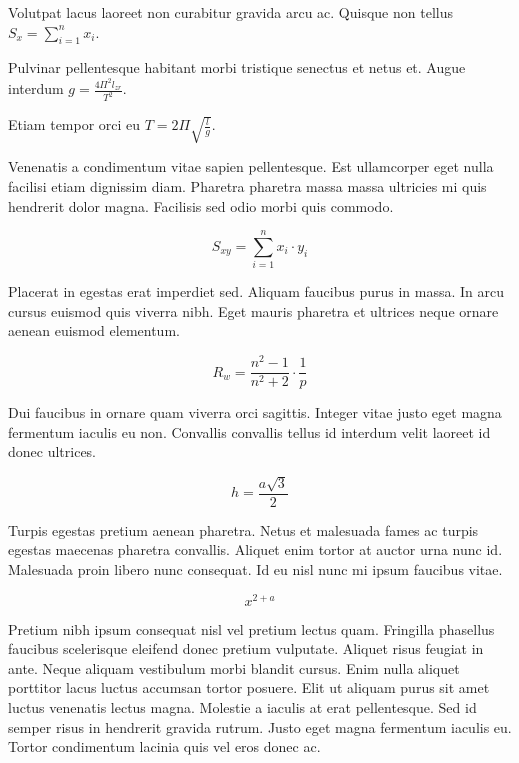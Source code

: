 \documentclass{article}
\begin{document}
Volutpat lacus laoreet non curabitur gravida arcu ac. Quisque non tellus \begin{math}
	S_x=\sum_{i=1}^{n}x_i
\end{math}.\newline

Pulvinar pellentesque habitant morbi tristique senectus et netus et. Augue interdum $ g=\frac{4\Pi^2l_{zr}}{T^2} $.\newline

Etiam tempor orci eu \( T=2\Pi \sqrt{\frac{l}{g}} \).\newline

Venenatis a condimentum vitae sapien pellentesque. Est ullamcorper eget nulla facilisi etiam dignissim diam. Pharetra pharetra massa massa ultricies mi quis hendrerit dolor magna. Facilisis sed odio morbi quis commodo.

\[ S_{xy}=\sum_{i=1}^{n}x_i\cdot y_i \]

Placerat in egestas erat imperdiet sed. Aliquam faucibus purus in massa. In arcu cursus euismod quis viverra nibh. Eget mauris pharetra et ultrices neque ornare aenean euismod elementum.

$$ R_w=\frac{n^2-1}{n^2+2} \cdot \frac{1}{p} $$

Dui faucibus in ornare quam viverra orci sagittis. Integer vitae justo eget magna fermentum iaculis eu non. Convallis convallis tellus id interdum velit laoreet id donec ultrices. 

\begin{displaymath}
	h=\frac{a\sqrt{3}}{2}
\end{displaymath}

Turpis egestas pretium aenean pharetra. Netus et malesuada fames ac turpis egestas maecenas pharetra convallis. Aliquet enim tortor at auctor urna nunc id. Malesuada proin libero nunc consequat. Id eu nisl nunc mi ipsum faucibus vitae.

\begin{equation}
	x^{2+a}
\end{equation}

Pretium nibh ipsum consequat nisl vel pretium lectus quam. Fringilla phasellus faucibus scelerisque eleifend donec pretium vulputate. Aliquet risus feugiat in ante. Neque aliquam vestibulum morbi blandit cursus. Enim nulla aliquet porttitor lacus luctus accumsan tortor posuere. Elit ut aliquam purus sit amet luctus venenatis lectus magna. Molestie a iaculis at erat pellentesque. Sed id semper risus in hendrerit gravida rutrum. Justo eget magna fermentum iaculis eu. Tortor condimentum lacinia quis vel eros donec ac.
\end{document}
